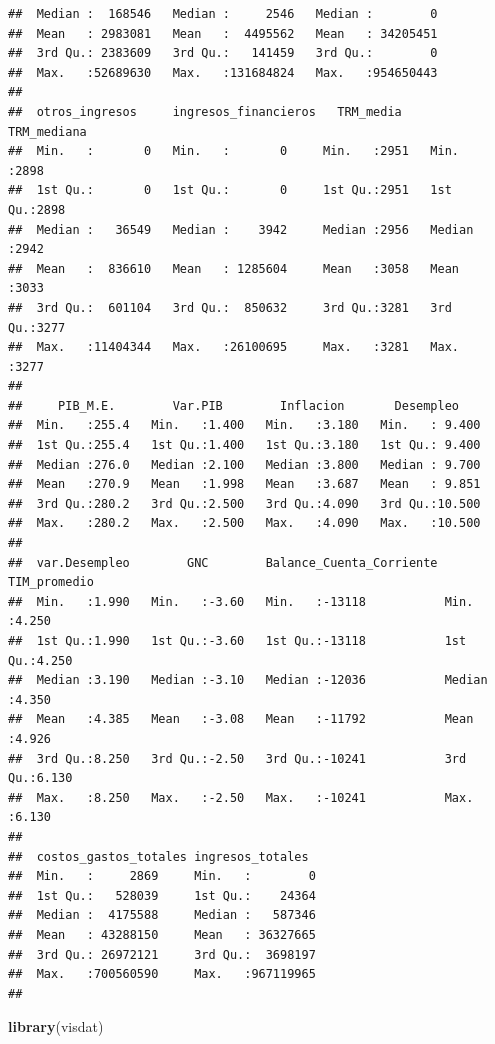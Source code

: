 \documentclass[
  11pt,
]{article}
\newenvironment{Shaded}{\begin{snugshade}}{\end{snugshade}}
\newcommand{\KeywordTok}[1]{\textcolor[rgb]{0.13,0.29,0.53}{\textbf{#1}}}
\newcommand{\NormalTok}[1]{#1}
\begin{document}
\begin{verbatim}
##  Median :  168546   Median :     2546   Median :        0              
##  Mean   : 2983081   Mean   :  4495562   Mean   : 34205451              
##  3rd Qu.: 2383609   3rd Qu.:   141459   3rd Qu.:        0              
##  Max.   :52689630   Max.   :131684824   Max.   :954650443              
##                                                                        
##  otros_ingresos     ingresos_financieros   TRM_media     TRM_mediana  
##  Min.   :       0   Min.   :       0     Min.   :2951   Min.   :2898  
##  1st Qu.:       0   1st Qu.:       0     1st Qu.:2951   1st Qu.:2898  
##  Median :   36549   Median :    3942     Median :2956   Median :2942  
##  Mean   :  836610   Mean   : 1285604     Mean   :3058   Mean   :3033  
##  3rd Qu.:  601104   3rd Qu.:  850632     3rd Qu.:3281   3rd Qu.:3277  
##  Max.   :11404344   Max.   :26100695     Max.   :3281   Max.   :3277  
##                                                                       
##     PIB_M.E.        Var.PIB        Inflacion       Desempleo     
##  Min.   :255.4   Min.   :1.400   Min.   :3.180   Min.   : 9.400  
##  1st Qu.:255.4   1st Qu.:1.400   1st Qu.:3.180   1st Qu.: 9.400  
##  Median :276.0   Median :2.100   Median :3.800   Median : 9.700  
##  Mean   :270.9   Mean   :1.998   Mean   :3.687   Mean   : 9.851  
##  3rd Qu.:280.2   3rd Qu.:2.500   3rd Qu.:4.090   3rd Qu.:10.500  
##  Max.   :280.2   Max.   :2.500   Max.   :4.090   Max.   :10.500  
##                                                                  
##  var.Desempleo        GNC        Balance_Cuenta_Corriente  TIM_promedio  
##  Min.   :1.990   Min.   :-3.60   Min.   :-13118           Min.   :4.250  
##  1st Qu.:1.990   1st Qu.:-3.60   1st Qu.:-13118           1st Qu.:4.250  
##  Median :3.190   Median :-3.10   Median :-12036           Median :4.350  
##  Mean   :4.385   Mean   :-3.08   Mean   :-11792           Mean   :4.926  
##  3rd Qu.:8.250   3rd Qu.:-2.50   3rd Qu.:-10241           3rd Qu.:6.130  
##  Max.   :8.250   Max.   :-2.50   Max.   :-10241           Max.   :6.130  
##                                                                          
##  costos_gastos_totales ingresos_totales   
##  Min.   :     2869     Min.   :        0  
##  1st Qu.:   528039     1st Qu.:    24364  
##  Median :  4175588     Median :   587346  
##  Mean   : 43288150     Mean   : 36327665  
##  3rd Qu.: 26972121     3rd Qu.:  3698197  
##  Max.   :700560590     Max.   :967119965  
## 
\end{verbatim}

\begin{Shaded}
\begin{Highlighting}[]
\KeywordTok{library}\NormalTok{(visdat)}
\end{Highlighting}
\end{Shaded}
\end{document}
